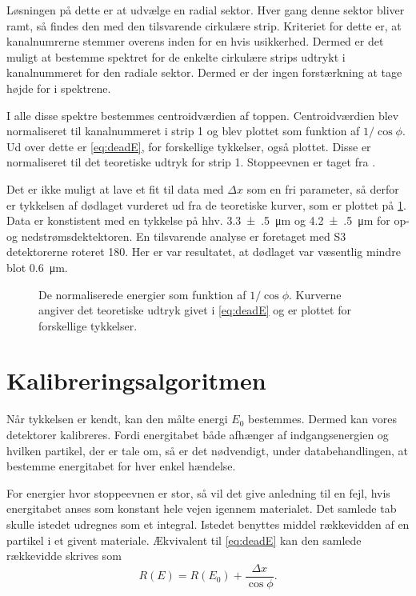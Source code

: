 Løsningen på dette er at udvælge en radial sektor. Hver gang denne sektor bliver ramt, så findes den
med den tilsvarende cirkulære strip. Kriteriet for dette er, at kanalnumrerne stemmer overens inden
for en hvis usikkerhed. Dermed er det muligt at bestemme spektret for de enkelte cirkulære strips
udtrykt i kanalnummeret for den radiale sektor. Dermed er der ingen forstærkning at tage
højde for i spektrene.

I alle disse spektre bestemmes centroidværdien af \Pu toppen.
Centroidværdien blev normaliseret til kanalnummeret i strip 1 og blev plottet som funktion af
$1/{\cos \phi}$. Ud over dette er \cref{eq:deadE}, for forskellige tykkelser, også plottet. Disse er
normaliseret til det teoretiske udtryk for strip 1. Stoppeevnen er taget fra \cite{Ziegler}.

Det er ikke muligt at lave et fit til data med $\Delta x$ som en fri parameter, så derfor er tykkelsen af
dødlaget vurderet ud fra de teoretiske kurver, som er plottet på \cref{fig:dead}. Data er
konstistent med en tykkelse på hhv. \SI{3.3(5)}{\um} og \SI{4.2(5)}{\um} for op- og
nedstrømsdektektoren. En tilsvarende analyse er foretaget med S3 detektorerne roteret
180\degree. Her er var resultatet, at dødlaget var væsentlig mindre blot
\SI{0.6}{\um}. 

\begin{figure}[h]
  \centering
  \hfill
  \caption{De normaliserede energier som funktion af $1/{\cos\phi}$. Kurverne angiver det teoretiske
    udtryk givet i \cref{eq:deadE} og er plottet for forskellige tykkelser.}
  \label{fig:dead}
\end{figure}


\section{Kalibreringsalgoritmen}
\label{sec:kalalgo}

Når tykkelsen er kendt, kan den målte energi $E_{0}$ bestemmes. Dermed kan vores detektorer
kalibreres. Fordi energitabet både afhænger af indgangsenergien og hvilken partikel, der er tale om,
så er det nødvendigt, under databehandlingen, at bestemme energitabet for hver enkel hændelse.

For energier hvor stoppeevnen er stor, så vil det give anledning til en fejl, hvis energitabet anses
som konstant hele vejen igennem materialet. Det samlede tab skulle istedet udregnes som et
integral. Istedet benyttes middel rækkevidden af en partikel i et givent
materiale. Ækvivalent til \cref{eq:deadE} kan den samlede rækkevidde skrives som
\begin{equation}
  \label{eq:deadR}
  R(E) = R(E_{0}) + \frac{\Delta x}{\cos \phi} .
\end{equation}

